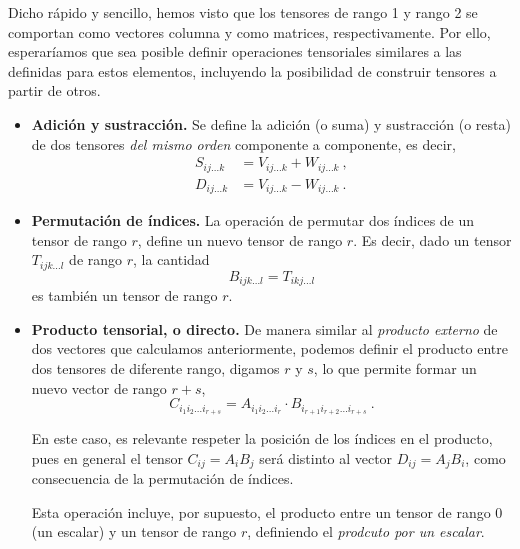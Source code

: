 Dicho rápido y sencillo, hemos visto que los tensores de rango 1 y rango 2 se comportan como vectores columna y como matrices, respectivamente. Por ello, esperaríamos que sea posible definir operaciones tensoriales similares a las definidas para estos elementos, incluyendo la posibilidad de construir tensores a partir de otros.

\begin{itemize}
    \item \textbf{Adición y sustracción.} Se define la adición (o suma) y sustracción (o resta) de dos tensores \emph{del mismo orden} componente a componente, es decir,
    \begin{align}
        S_{ij \dots k} & = V_{ij \dots k} + W_{ij \dots k} \ , \\
        D_{ij \dots k} & = V_{ij \dots k} - W_{ij \dots k} \ .
    \end{align}
    \item \textbf{Permutación de índices.} La operación de permutar dos índices de un tensor de rango $r$, define un nuevo tensor de rango $r$. Es decir, dado un tensor $T_{ijk \dots l}$ de rango $r$, la cantidad
    \begin{equation}
        B_{ijk \dots l} = T_{ikj \dots l} 
    \end{equation}
    es también un tensor de rango $r$.

    \item \textbf{Producto tensorial, o directo.} De manera similar al \emph{producto externo} de dos vectores que calculamos anteriormente, podemos definir el producto entre dos tensores de diferente rango, digamos $r$ y $s$, lo que permite formar un nuevo vector de rango $r+s$,
    \begin{equation}
        C_{i_1 i_2 \dots i_{r+s}} = A_{i_1 i_2 \dots i_r} \cdot B_{i_{r+1} i_{r+2} \dots i_{r+s}} \ .
    \end{equation}
    
    En este caso, es relevante respeter la posición de los índices en el producto, pues en general el tensor $C_{ij} = A_i B_j$ será distinto al vector $D_{ij} = A_j B_i$, como consecuencia de la permutación de índices.

    Esta operación incluye, por supuesto, el producto entre un tensor de rango 0 (un escalar) y un tensor de rango $r$, definiendo el \emph{prodcuto por un escalar}.


\end{itemize}
